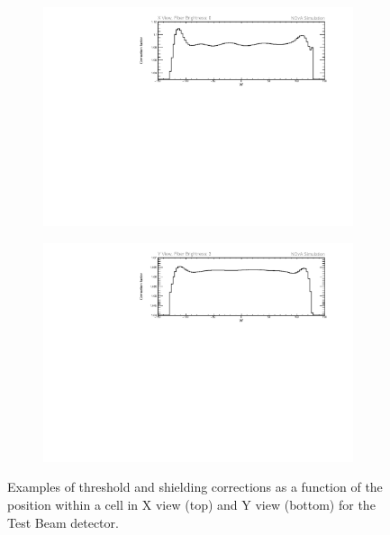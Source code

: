 \begin{figure}[!hbtp]
\centering
\begin{subfigure}[t]{\textwidth}
\centering
\includegraphics[width=\textwidth]{Plots/TBCalibration/ThresholdCorrectionExample_axview_fb0_P4DataBasedSim.pdf}
\end{subfigure}
\begin{subfigure}[b]{\textwidth}
\centering
\includegraphics[width=\textwidth]{Plots/TBCalibration/ThresholdCorrectionExample_ayview_fb3_P4DataBasedSim.pdf}
\end{subfigure}
\caption{Examples of threshold and shielding corrections as a function of the position within a cell in X view (top) and Y view (bottom) for the Test Beam detector.}
\label{fig:TBThresholdCorrectionExamples}
\end{figure}

